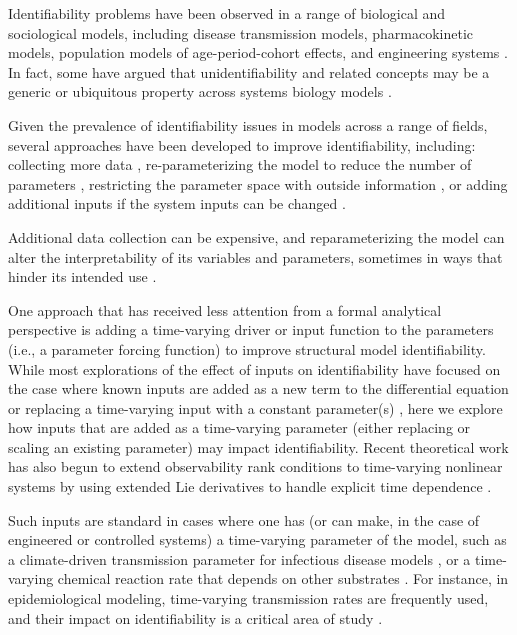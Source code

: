 \documentclass[a4paper,fleqn]{cas-dc}
\theoremstyle{definition}
\begin{document}
Identifiability problems have been observed in a range of biological and sociological models, including disease transmission models, pharmacokinetic models, population models of age-period-cohort effects, and engineering systems \cite{kao2018practical, roosa2019assessing,sefkow1996kinetic, cole2010determining, conrad2016modeling, bakshi1993optimal}. In fact, some have argued that unidentifiability and related concepts may be a generic or ubiquitous property across systems biology models \cite{gutenkunst2007sloppiness}.

Given the prevalence of identifiability issues in models across a range of fields, several approaches have been developed to improve identifiability, including: collecting more data \cite{raue2011addressing, kutalik2004optimal, balsa2008computational, raue2009structural}, re-parameterizing the model to reduce the number of parameters \cite{meshkat2009algorithm, meshkat2014finding, raue2011addressing}, restricting the parameter space with outside information \cite{raue2009structural}, or adding additional inputs if the system inputs can be changed \cite{villaverde2018input, meshkat2012alternative}.

Additional data collection can be expensive, and reparameterizing the model can alter the interpretability of its variables and parameters, sometimes in ways that hinder its intended use \cite{tikhomirov2008interiors, kao2018practical, chowell2017fitting, mordecai2013optimal}.

One approach that has received less attention from a formal analytical perspective is adding a time-varying driver or input function to the parameters (i.e., a parameter forcing function) to improve structural model identifiability.
While most explorations of the effect of inputs on identifiability have focused on the case where known inputs are added as a new term to the differential equation \cite{massonis2021structural, iliadis2019structural, distefano2015dynamic} or replacing a time-varying input with a constant parameter(s) \cite{villaverde2018input}, here we explore how inputs that are added as a time-varying parameter (either replacing or scaling an existing parameter) may impact identifiability. Recent theoretical work has also begun to extend observability rank conditions to time-varying nonlinear systems by using extended Lie derivatives to handle explicit time dependence \cite{martinelli2022extension}.

Such inputs are standard in cases where one has (or can make, in the case of engineered or controlled systems) a time-varying parameter of the model, such as a climate-driven transmission parameter for infectious disease models \cite{eisenberg2013examining, aldstadt2012space, chaves2012nonlinear, rotela2007space}, or a time-varying chemical reaction rate that depends on other substrates \cite{cepeda2019estimating, endalew2020flow, bakshi1993optimal}.
For instance, in epidemiological modeling, time-varying transmission rates are frequently used, and their impact on identifiability is a critical area of study \cite{gallo2022lack, cumsille2023general}.
\end{document}
